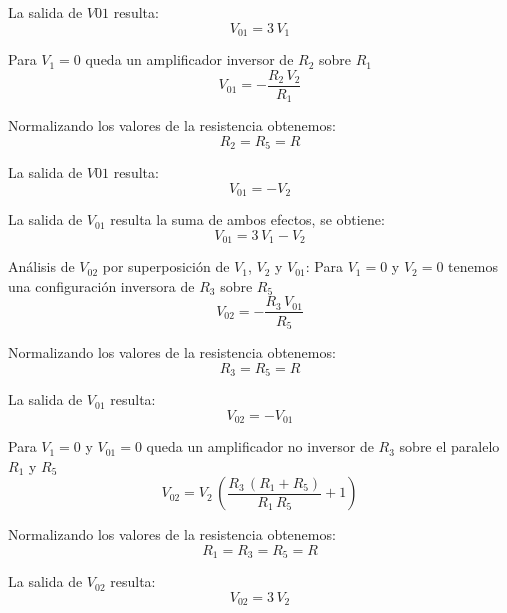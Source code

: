 \documentclass[12pt]{article}
\begin{document}
		La salida de $V01$ resulta:
		\begin{equation}
			V_{01}=3\,V_1
		\end{equation}
		
		Para $V_1=0$ queda un amplificador inversor de $R_2$ sobre $R_1$ 
		\begin{equation}
			V_{01} = -\frac{R_2 \,V_2 }{R_1 }
		\end{equation}
		
		Normalizando los valores de la resistencia obtenemos:
		\begin{equation}
			R_2=R_5=R 
		\end{equation}
		
		La salida de $V01$ resulta:
		\begin{equation}
			V_{01}=-V_2
		\end{equation}
		
		La salida de $V_{01}$ resulta la suma de ambos efectos, se obtiene:
		\begin{equation}
			V_{01}=3\,V_1-V_2
		\end{equation}
		
		Análisis de $V_{02}$ por superposición de $V_1$, $V_2$ y $V_{01}$:
		Para $V_1=0$ y $V_2=0$  tenemos una configuración inversora de $R_3$ sobre $R_5$
		\begin{equation}
			V_{02}=-\frac{R_3 \,V_{01} }{R_5 }
		\end{equation}
		
		Normalizando los valores de la resistencia obtenemos:
		\begin{equation}
			R_3=R_5=R 
		\end{equation}
		
		La salida de $V_{01}$ resulta:
		\begin{equation}
			V_{02}=-V_{01}
		\end{equation}
		
		Para $V_1=0$ y $V_{01}=0$ queda un amplificador no inversor de $R_3$ sobre el paralelo $R_1$ y $R_5$
		\begin{equation}
			V_{02} = V_2 \,{\left(\frac{R_3 \,{\left(R_1 +R_5 \right)}}{R_1 \,R_5 }+1\right)}
		\end{equation}
		
		Normalizando los valores de la resistencia obtenemos:
		\begin{equation}
			R_1=R_3=R_5=R 
		\end{equation}
		
		La salida de $V_{02}$ resulta:
		\begin{equation}
			V_{02}=3\,V_2
		\end{equation}
		
\end{document}

